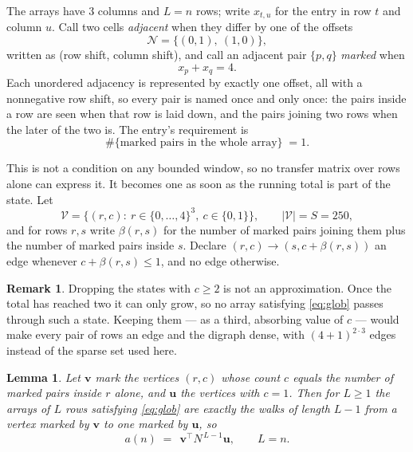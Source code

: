 \documentclass[11pt,a4paper]{article}
\theoremstyle{plain}
\newtheorem{lemma}[theorem]{Lemma}
\theoremstyle{definition}
\newtheorem{remark}[theorem]{Remark}
\begin{document}
The arrays have $3$ columns and $L=n$ rows; write $x_{t,u}$ for the entry in
row $t$ and column $u$. Call two cells \emph{adjacent} when they differ by one of the
offsets
\[
\mathcal N=\{(0,1),\ (1,0)\},
\]
written as (row shift, column shift), and call an adjacent pair $\{p,q\}$
\emph{marked} when
\[
x_{p}+x_{q}=4 .
\]
Each unordered adjacency is represented by exactly one offset, all with a nonnegative row
shift, so every pair is named once and only once: the pairs inside a row are seen when
that row is laid down, and the pairs joining two rows when the later of the two is. The
entry's requirement is
\begin{equation}\label{eq:glob}
\#\{\text{marked pairs in the whole array}\}\;=1.
\end{equation}

This is not a condition on any bounded window, so no transfer matrix over rows alone can
express it. It becomes one as soon as the running total is part of the state. Let
\[
\mathcal V=\bigl\{(r,c):\ r\in\{0,\dots,4\}^{3},\ c\in\{0,1\}\bigr\},
\qquad |\mathcal V|=S=250,
\]
and for rows $r,s$ write $\beta(r,s)$ for the number of marked pairs joining them plus the
number of marked pairs inside $s$. Declare $(r,c)\to(s,c+\beta(r,s))$ an edge whenever
$c+\beta(r,s)\le1$, and no edge otherwise.

\begin{remark}
Dropping the states with $c\ge2$ is not an approximation. Once the total has reached two it
can only grow, so no array satisfying \eqref{eq:glob} passes through such a state. Keeping
them --- as a third, absorbing value of $c$ --- would make every pair of rows an edge and
the digraph dense, with $(4+1)^{2\cdot3}$ edges instead of the sparse set used here.
\end{remark}

\begin{lemma}\label{lem:walk}
Let $\mathbf{v}$ mark the vertices $(r,c)$ whose count $c$ equals the number of marked pairs
inside $r$ alone, and $\mathbf{u}$ the vertices with $c=1$. Then for $L\ge1$ the arrays
of $L$ rows satisfying \eqref{eq:glob} are exactly the walks of length $L-1$ from a
vertex marked by $\mathbf{v}$ to one marked by $\mathbf{u}$, so
\[
a(n)\;=\;\,\mathbf{v}^{\!\top}N^{\,L-1}\mathbf{u},\qquad L=n .
\]
\end{lemma}
\end{document}
